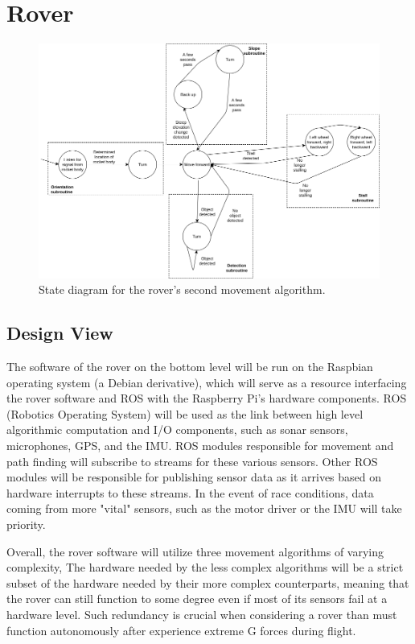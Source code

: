 \documentclass[onecolumn, draftclsnofoot,10pt, compsoc]{IEEEtran}
\begin{document}
\section{Rover}
\begin{figure}[h]
	\begin{center}
		\caption{State diagram for the rover's second movement algorithm. }
		\includegraphics[width=\textwidth]{RoverStateDiagram}
	\end{center}
\end{figure}
\subsection{Design View}
The software of the rover on the bottom level will be run on the Raspbian operating system (a Debian derivative), which will serve as a resource interfacing the rover software and ROS with the Raspberry Pi's hardware components. ROS (Robotics Operating System) will be used as the link between high level algorithmic computation and I/O components, such as sonar sensors, microphones, GPS, and the IMU. ROS modules responsible for movement and path finding will subscribe to streams for these various sensors. Other ROS modules will be responsible for publishing sensor data as it arrives based on hardware interrupts to these streams. In the event of race conditions, data coming from more "vital" sensors, such as the motor driver or the IMU will take priority. 

Overall, the rover software will utilize three movement algorithms of varying complexity, The hardware needed by the less complex algorithms will be a strict subset of the hardware needed by their more complex counterparts, meaning that the rover can still function to some degree even if most of its sensors fail at a hardware level. Such redundancy is crucial when considering a rover than must function autonomously after experience extreme G forces during flight. 
\end{document}
